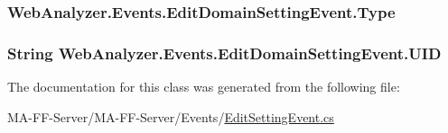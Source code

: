 \subsubsection[{Type}]{ Web\+Analyzer.\+Events.\+Edit\+Domain\+Setting\+Event.\+Type\hspace{0.3cm}{\ttfamily [get]}}\label{class_web_analyzer_1_1_events_1_1_edit_domain_setting_event_a36f36d7fa2adf9fb69c62c4dbdcf034e}
\hypertarget{class_web_analyzer_1_1_events_1_1_edit_domain_setting_event_ad1c58d61b04b924664078c684161f861}{}
\subsubsection[{U\+I\+D}]{\setlength{\rightskip}{0pt plus 5cm}String Web\+Analyzer.\+Events.\+Edit\+Domain\+Setting\+Event.\+U\+I\+D\hspace{0.3cm}{\ttfamily [get]}}\label{class_web_analyzer_1_1_events_1_1_edit_domain_setting_event_ad1c58d61b04b924664078c684161f861}


The documentation for this class was generated from the following file\+:\begin{DoxyCompactItemize}
\item 
M\+A-\/\+F\+F-\/\+Server/\+M\+A-\/\+F\+F-\/\+Server/\+Events/\hyperlink{_edit_setting_event_8cs}{Edit\+Setting\+Event.\+cs}\end{DoxyCompactItemize}
